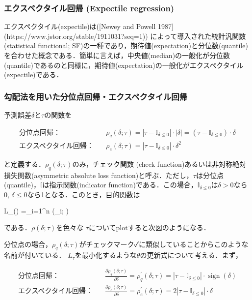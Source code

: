 \subsubsection{エクスペクタイル回帰 (Expectile regression)}
エクスペクタイル(expectile)は([Newey and Powell 1987](https://www.jstor.org/stable/1911031?seq=1)) によって導入された統計汎関数 (statistical functional; SF)の一種であり，期待値(expectation)と分位数(quantile)を合わせた概念である．簡単に言えば，中央値(median)の一般化が分位数(quantile)であるのと同様に，期待値(expectation)の一般化がエクスペクタイル(expectile)である．
\subsubsection{勾配法を用いた分位点回帰・エクスペクタイル回帰}
予測誤差$\delta$と$\tau$の関数を


\begin{align}
\text{分位点回帰：}&\quad
\rho_q(\delta; \tau)=\left|\tau-\mathbb{I}_{\delta \leq 0}\right|\cdot |\delta|=\left(\tau-\mathbb{I}_{\delta \leq 0}\right)\cdot \delta\\
\text{エクスペクタイル回帰：}&\quad
\rho_e(\delta; \tau)=\left|\tau-\mathbb{I}_{\delta \leq 0}\right|\cdot \delta^2
\end{align}


と定義する．$\rho_q(\delta; \tau)$のみ，チェック関数 (check function)あるいは非対称絶対損失関数(asymmetric absolute loss function)と呼ぶ．ただし，$\tau$は分位点(quantile)，$\mathbb{I}$は指示関数(indicator function)である．この場合，$\mathbb{I}_{\delta \leq 0}$は$\delta \gt 0$なら0, $\delta \leq 0$なら1となる．このとき，目的関数は 


L_{\tau}(\delta)
=\sum_{i=1}^n \rho(\delta_i; \tau)


である．$\rho(\delta; \tau)$を色々な $\tau$についてplotすると次図のようになる．


分位点の場合，$\rho_q(\delta; \tau)$がチェックマーク✓に類似していることからこのような名前が付いている．
$L_\tau$を最小化するような$\theta$の更新式について考える．まず，



\begin{align}
\text{分位点回帰：}&\quad
\frac{\partial \rho_q(\delta; \tau)}{\partial \delta}= \rho_q^{\prime}(\delta; \tau)=\left|\tau-\mathbb{I}_{\delta \leq 0}\right| \cdot
\operatorname{sign}(\delta)\\
\text{エクスペクタイル回帰：}&\quad
\frac{\partial \rho_e(\delta; \tau)}{\partial \delta}= \rho_e^{\prime}(\delta; \tau)=2\left|\tau-\mathbb{I}_{\delta \leq 0}\right| \cdot
\delta
\end{align}


